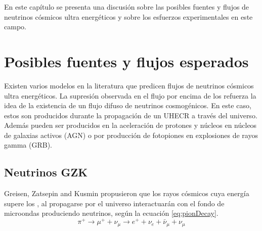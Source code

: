 En este cap\'itulo se presenta una discusi\'on sobre las posibles fuentes y flujos de neutrinos c\'osmicos ultra energ\'eticos 
y sobre los esfuerzos experimentales en este campo.

\section{Posibles fuentes y flujos esperados}
\label{sec:fuentes}

Existen varios modelos en la literatura que predicen flujos de neutrinos c\'osmicos ultra energ\'eticos.
La supresi\'on observada en el flujo por encima de los  refuerza la idea de la existencia de un flujo difuso de neutrinos cosmog\'enicos.
En este caso, estos son producidos durante la propagaci\'on de un UHECR a trav\'es del universo. 
Adem\'as pueden ser producidos en la aceleraci\'on de protones y n\'ucleos en n\'ucleos de galaxias activos (AGN)\cite{cite:nuAGN} o por producci\'on de fotopiones en explosiones de rayos gamma (GRB)\cite{cite:nuGRB}.


	\subsection{Neutrinos GZK}
	\label{sbsc:introGZK}
	Greisen, Zatsepin and Kusmin propusieron que los rayos c\'osmicos cuya energ\'ia supere los , al propagarse por el universo interactuar\'an con el fondo de microondas produciendo neutrinos, seg\'un la ecuaci\'on \ref{eq:pionDecay}.
	\begin{equation}\label{eq:pionDecay}
	\pi^{+} \rightarrow \mu^{+}+ \nu_{\mu} \rightarrow e^{+} + \nu_{e} + \bar{\nu}_{\mu} + \nu_{\mu}
	\end{equation}
	
